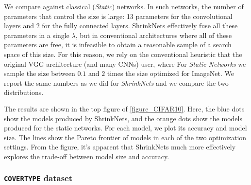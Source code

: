 We compare against classical (\textit{Static}) networks. In such networks, the number of
parameters that control the size is large: 13 parameters for the convolutional
layers and $2$ for the fully connected layers. ShrinkNets effectively fuse
all these parameters in a single $\lambda$, but in conventional architectures
where all of these parameters are free, it is infeasible to obtain a reasonable
sample of a search space of this size. For this reason, we rely on the conventional
 heuristic that the original VGG architecture (and many CNNs)  user, where  For \textit{Static Networks}
we sample the size between $0.1$ and $2$ times the size  optimized for ImageNet. 
We report the same numbers as we did for \textit{ShrinkNets} and we compare the
two distributions.  

The results are shown in the top figure of \cref{figure_CIFAR10}. Here, the blue dots show the models produced by ShrinkNets, and the orange dots show the models produced for the static networks.  For each model, we plot its accuracy and model size. The lines show the Pareto frontier of models in each of the two optimization settings. From the figure, it's apparent that ShrinkNets much more effectively explores the trade-off between model size and accuracy.


\subsubsection{\texttt{COVERTYPE} dataset}

